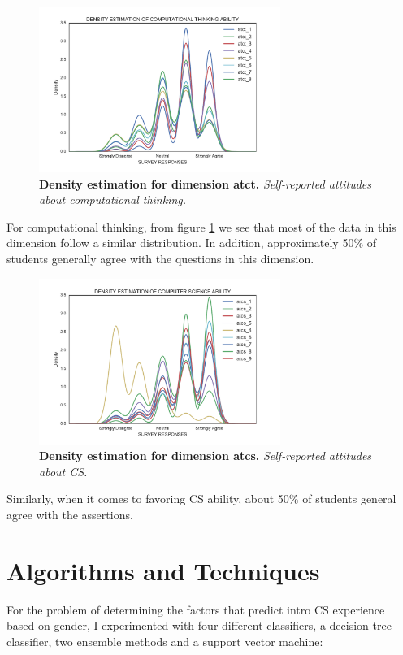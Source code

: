 \begin{figure}[!hbtp]
\centering
    \caption{\textbf{Density estimation for dimension atct. }\textit{Self-reported attitudes about computational thinking.}}\label{atct_dimension}
    \includegraphics[width=0.7\textwidth]{figures/atct_kde}
\end{figure}
For computational thinking, from figure \ref{atct_dimension} we see that most of the data in this dimension follow a similar distribution. In addition, approximately 50\% of students generally agree with the questions in this dimension.
\begin{figure}[!hbtp]
\centering
    \caption{\textbf{Density estimation for dimension atcs. }\textit{Self-reported attitudes about CS.}}\label{atcs_dimension}
    \includegraphics[width=0.7\textwidth]{figures/atcs_kde}
\end{figure}
Similarly, when it comes to favoring CS ability, about 50\% of students general agree with the assertions. 


\section*{Algorithms and Techniques}

For the problem of determining the factors that predict intro CS experience based on gender, I experimented with four different classifiers, a decision tree classifier, two ensemble methods and a support vector machine:

